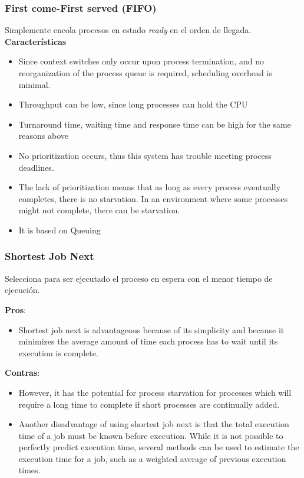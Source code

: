 \documentclass[a4paper, twoside]{article}
\begin{document}
\subsubsection{First come-First served (FIFO)}

Simplemente encola procesos en estado \emph{ready} en el orden de llegada.\\

\textbf{Características}

\begin{itemize}
  \item Since context switches only occur upon process termination,
  and no reorganization of the process queue is required, scheduling overhead
  is minimal.
  \item Throughput can be low, since long processes can hold the CPU
  \item Turnaround time, waiting time and response time can be high for
  the same reasons above
  \item No prioritization occurs, thus this system has trouble meeting process
  deadlines.
  \item The lack of prioritization means that as long as every process
  eventually completes, there is no starvation.
  In an environment where some processes might not complete, there can be
  starvation.
  \item It is based on Queuing
\end{itemize}

\subsubsection{Shortest Job Next}

Selecciona para ser ejecutado el proceso en espera con el menor tiempo de
ejecución.

\textbf{Pros}:
\begin{itemize}
  \item Shortest job next is advantageous because of its simplicity and because
  it minimizes the average amount of time each process has to wait until its
  execution is complete. 
\end{itemize}

\textbf{Contras}:
\begin{itemize}
  \item However, it has the potential for process starvation for processes
  which will require a long time to complete if short processes are continually
  added.
  \item Another disadvantage of using shortest job next is that the total
  execution time of a job must be known before execution. While it is not
  possible to perfectly predict execution time, several methods can be used to
  estimate the execution time for a job, such as a weighted average of previous
  execution times.
\end{itemize}
\end{document}

